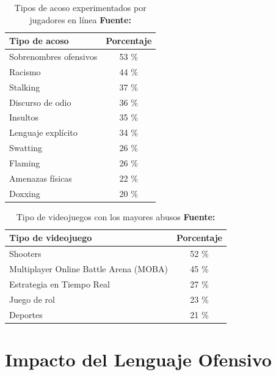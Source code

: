 \vspace{0.5cm}

\begin{table}[h!]
    \centering
    \begin{tabular}{l c}
        \hline
        \textbf{Tipo de acoso} & \textbf{Porcentaje} \\
        \hline
        Sobrenombres ofensivos & 53 \% \\
        Racismo & 44 \% \\
        Stalking & 37 \% \\
        Discurso de odio & 36 \% \\
        Insultos & 35 \% \\
        Lenguaje explícito & 34 \% \\
        Swatting & 26 \% \\
        Flaming & 26 \% \\
        Amenazas físicas & 22 \% \\
        Doxxing & 20 \% \\
        \hline
    \end{tabular}
    \caption{Tipos de acoso experimentados por jugadores en línea \textbf{Fuente:} \cite{preply2022games}}
\end{table}

\begin{table}[h!]
    \centering
    \begin{tabular}{l c}
        \hline
        \textbf{Tipo de videojuego} & \textbf{Porcentaje} \\
        \hline
        Shooters & 52 \% \\
        Multiplayer Online Battle Arena (MOBA) & 45 \% \\
        Estrategia en Tiempo Real & 27 \% \\
        Juego de rol & 23 \% \\
        Deportes & 21 \% \\
        \hline
    \end{tabular}
    \caption{Tipo de videojuegos con los mayores abusos \textbf{Fuente:} \cite{preply2022games}}
\end{table}

\section{Impacto del Lenguaje Ofensivo}


